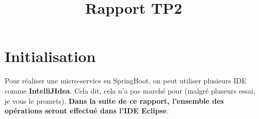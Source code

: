 \documentclass{rapport}
\title{Rapport TP2} %
\begin{document}

\unif{}



\newpage


\renewcommand*\contentsname{Sommaire}       
\makenomenclature %
\fairepagedegarde %





\iffalse
\begin{figure}[H]
	\centering
    \texttt{[image: images/Config\_1\_3.png]}
    \caption{Configuration}
\end{figure}
\FloatBarrier


\begin{minipage}{0.5\textwidth}
\texttt{[image: images/P1/Q4\_a1.png]}
\captionof{figure}{Tentative de lister le contenu}
\label{fig:figure}
\end{minipage}
\hspace{1cm}
\begin{minipage}{0.5\textwidth}
\texttt{[image: images/P1/Q4\_b.png]}
\captionof{figure}{Listing avec \textbf{info2}}
\label{fig:figure}
\vspace{1cm}
\end{minipage}


\fi

\section{Initialisation}

Pour réaliser une micro-service en SpringBoot, on peut utiliser plusieurs IDE comme \textbf{IntelliJIdea}. Cela dit, cela n'a pas marché pour (malgré pluseurs essai, je vous le promets). \textbf{Dans la suite de ce rapport, l'ensemble des opérations seront effectué dans l'IDE Eclipse}.\newline
\end{document}

